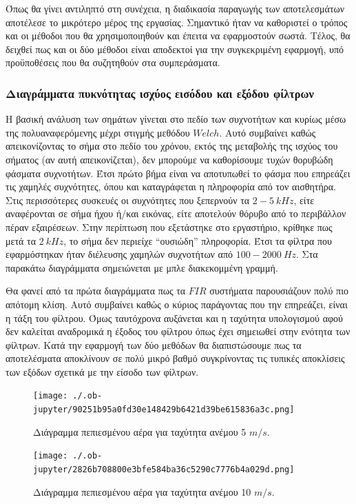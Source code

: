 \documentclass[breaklines=true, 12pt]{article}
\begin{document}
Όπως θα γίνει αντιληπτό στη συνέχεια, η διαδικασία παραγωγής των αποτελεσμάτων
αποτέλεσε το μικρότερο μέρος της εργασίας. Σημαντικό ήταν να καθοριστεί ο
τρόπος και οι μέθοδοι που θα χρησιμοποιηθούν και έπειτα να εφαρμοστούν
σωστά. Τέλος, θα δειχθεί πως και οι δύο μέθοδοι είναι αποδεκτοί για την
συγκεκριμένη εφαρμογή, υπό προϋποθέσεις που θα συζητηθούν στα συμπεράσματα.
\clearpage
\subsubsection{Διαγράμματα πυκνότητας ισχύος εισόδου και εξόδου φίλτρων}
\label{sec:orgfe1fef3}
Η βασική ανάλυση των σημάτων γίνεται στο πεδίο των συχνοτήτων και κυρίως
μέσω της πολυαναφερόμενης μέχρι στιγμής μεθόδου \(Welch\). Αυτό συμβαίνει
καθώς απεικονίζοντας το σήμα στο πεδίο του χρόνου, εκτός της μεταβολής της
ισχύος του σήματος (αν αυτή απεικονίζεται), δεν μπορούμε να καθορίσουμε
τυχών θορυβώδη φάσματα συχνοτήτων. Έτσι πρώτο βήμα είναι να αποτυπωθεί το
φάσμα που επηρεάζει τις χαμηλές συχνότητες, όπου και καταγράφεται η
πληροφορία από τον αισθητήρα. Στις περισσότερες συσκευές οι συχνότητες
που ξεπερνούν τα \(2-5\ kHz\), είτε αναφέρονται σε σήμα ήχου ή/και εικόνας,
είτε αποτελούν θόρυβο από το περιβάλλον πέραν εξαιρέσεων. Στην περίπτωση
που εξετάστηκε στο εργαστήριο, κρίθηκε πως μετά τα \(2\ kHz\), το σήμα δεν
περιείχε “ουσιώδη” πληροφορία. Έτσι τα φίλτρα που εφαρμόστηκαν ήταν διέλευσης
χαμηλών συχνοτήτων από \(100-2000\ Hz\).  Στα παρακάτω διαγράμματα σημειώνεται
με μπλε διακεκομμένη γραμμή.

Θα φανεί από τα πρώτα διαγράμματα πως τα \(FIR\) συστήματα παρουσιάζουν πολύ
πιο απότομη κλίση. Αυτό συμβαίνει καθώς ο κύριος παράγοντας που την επηρεάζει,
είναι η τάξη του φίλτρου. Όμως ταυτόχρονα αυξάνεται και η ταχύτητα υπολογισμού
αφού δεν καλείται αναδρομικά η έξοδος του φίλτρου όπως έχει σημειωθεί στην
ενότητα των φίλτρων. Κατά την εφαρμογή των δύο μεθόδων θα διαπιστώσουμε πως τα
αποτελέσματα αποκλίνουν σε πολύ μικρό βαθμό συγκρίνοντας τις τυπικές
αποκλίσεις των εξόδων σχετικά με την είσοδο των φίλτρων.

\begin{figure}[htbp]
\centering
\texttt{[image: ./.ob-jupyter/90251b95a0fd30e148429b6421d39be615836a3c.png]}
\caption{\label{fc1_5}Διάγραμμα πεπιεσμένου αέρα για ταχύτητα ανέμου 5 \(m/s\).}
\end{figure}

\begin{figure}[htbp]
\centering
\texttt{[image: ./.ob-jupyter/2826b708800e3bfe584ba36c5290c7776b4a029d.png]}
\caption{\label{fc1_10}Διάγραμμα πεπιεσμένου αέρα για ταχύτητα ανέμου 10 \(m/s\).}
\end{figure}
\end{document}
